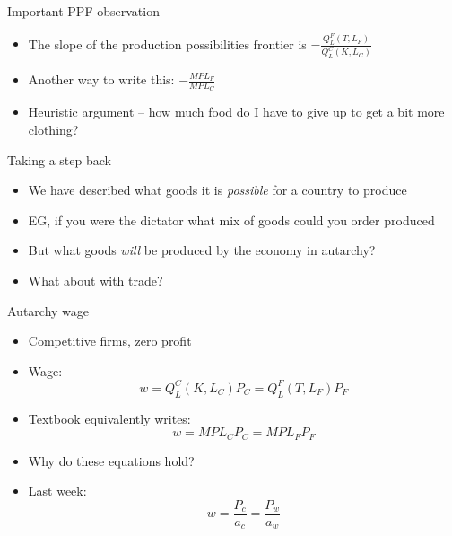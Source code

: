 \documentclass[ignorenonframetext,]{beamer}
\begin{document}
\begin{frame}{Important PPF observation}

    \begin{itemize}
        \item The slope of the production possibilities frontier is $-\frac{Q^F_L(T,L_F)}{Q^C_L(K,L_C)}$
        \item Another way to write this: $-\frac{MPL_F}{MPL_C}$
        \item Heuristic argument -- how much food do I have to give up to get a bit more clothing?
    \end{itemize}

\end{frame}

\begin{frame}{Taking a step back}

    \begin{itemize}
        \item We have described what goods it is \emph{possible} for a country to produce
        \item EG, if you were the dictator what mix of goods could you order produced
        \item But what goods \emph{will} be produced by the economy in autarchy?
        \item What about with trade?
    \end{itemize}

\end{frame}

\begin{frame}{Autarchy wage}

    \begin{itemize}
        \item Competitive firms, zero profit
        \item Wage:
            \begin{equation*}
                w = Q^C_L(K,L_C) P_C = Q^F_L(T,L_F) P_F
            \end{equation*}
        \item Textbook equivalently writes:
            \begin{equation*}
                w = MPL_C P_C = MPL_F P_F 
            \end{equation*}
        \item Why do these equations hold?
        \item Last week:
            \begin{equation*}
                w = \frac{P_c}{a_c} = \frac{P_w}{a_w}
            \end{equation*}
    \end{itemize}

\end{frame}
\end{document}
